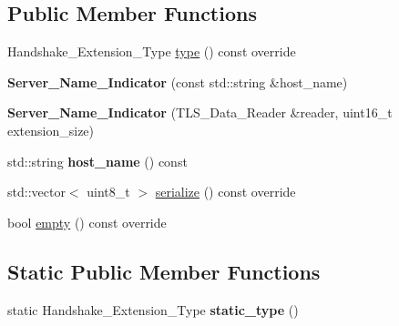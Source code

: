 \subsection*{Public Member Functions}
\begin{DoxyCompactItemize}
\item 
Handshake\+\_\+\+Extension\+\_\+\+Type \hyperlink{class_botan_1_1_t_l_s_1_1_server___name___indicator_a3ecbe137658cbab2797a05441e65f42f}{type} () const override
\item 
\mbox{\label{class_botan_1_1_t_l_s_1_1_server___name___indicator_a7d5960fcd5fcb3fc939112968dc4b8ae}} 
{\bfseries Server\+\_\+\+Name\+\_\+\+Indicator} (const std\+::string \&host\+\_\+name)
\item 
\mbox{\label{class_botan_1_1_t_l_s_1_1_server___name___indicator_ae376ef83ee5d49e0cce8089fc3c508bc}} 
{\bfseries Server\+\_\+\+Name\+\_\+\+Indicator} (T\+L\+S\+\_\+\+Data\+\_\+\+Reader \&reader, uint16\+\_\+t extension\+\_\+size)
\item 
\mbox{\label{class_botan_1_1_t_l_s_1_1_server___name___indicator_a1fb2c1f096aec8be1b5bbeda647a8241}} 
std\+::string {\bfseries host\+\_\+name} () const
\item 
std\+::vector$<$ uint8\+\_\+t $>$ \hyperlink{class_botan_1_1_t_l_s_1_1_server___name___indicator_ad45954f11df924771ad17662637bfc3c}{serialize} () const override
\item 
bool \hyperlink{class_botan_1_1_t_l_s_1_1_server___name___indicator_a24967daf77707733edc72619984bfb8a}{empty} () const override
\end{DoxyCompactItemize}
\subsection*{Static Public Member Functions}
\begin{DoxyCompactItemize}
\item 
\mbox{\label{class_botan_1_1_t_l_s_1_1_server___name___indicator_a5484b9262e16114c3b7abd76ebfed58a}} 
static Handshake\+\_\+\+Extension\+\_\+\+Type {\bfseries static\+\_\+type} ()
\end{DoxyCompactItemize}


